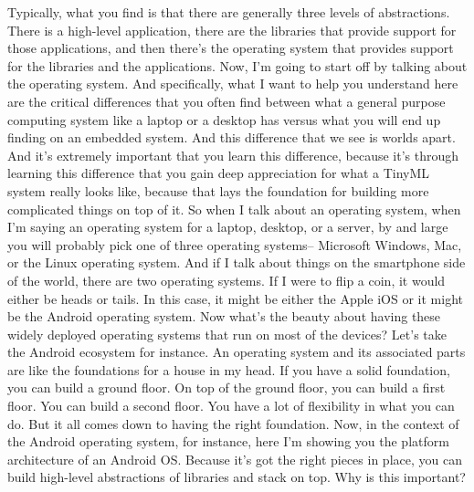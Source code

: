 Typically, what you find is that there are generally three levels of abstractions.
There is a high-level application, there are the libraries that provide support for those applications, and then there's the operating system that provides support for the libraries and the applications.
Now, I'm going to start off by talking about the operating system.
And specifically, what I want to help you understand here are the critical differences that you often find between what a general purpose computing system like a laptop or a desktop has versus what you will end up finding on an embedded system.
And this difference that we see is worlds apart.
And it's extremely important that you learn this difference, because it's through learning this difference that you gain deep appreciation for what a TinyML system really looks like, because that lays the foundation for building more complicated things on top of it.
So when I talk about an operating system, when I'm saying an operating system for a laptop, desktop, or a server, by and large you will probably pick one of three operating systems-- Microsoft Windows, Mac, or the Linux operating system.
And if I talk about things on the smartphone side of the world, there are two operating systems.
If I were to flip a coin, it would either be heads or tails.
In this case, it might be either the Apple iOS or it might be the Android operating system.
Now what's the beauty about having these widely deployed operating systems that run on most of the devices?
Let's take the Android ecosystem for instance.
An operating system and its associated parts are like the foundations for a house in my head.
If you have a solid foundation, you can build a ground floor.
On top of the ground floor, you can build a first floor.
You can build a second floor.
You have a lot of flexibility in what you can do.
But it all comes down to having the right foundation.
Now, in the context of the Android operating system, for instance, here I'm showing you the platform architecture of an Android OS.
Because it's got the right pieces in place, you can build high-level abstractions of libraries and stack on top.
Why is this important?


